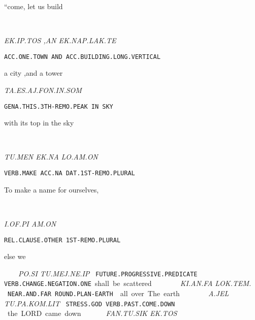 {“come, let us build                                                                          
\drie
 

\ek\ip\tos\comma~\an~\ek\nap\lak\te

{\it EK.IP.TOS		,AN	EK.NAP.LAK.TE	 }

{\tt ACC.ONE.TOWN		AND	ACC.BUILDING.LONG.VERTICAL }

a city			,and 	a tower	 
\drie

\ta\es\aj\fon\Atlanin\som

{\it TA.ES.AJ.FON.IN.SOM }

{\tt GENA.THIS.3TH-REMO.PEAK	IN	SKY }

with its top 				in           the sky 
\drie

  

\tu\men~	\ek\na~		\lo\am\on\comma

{\it TU.MEN	EK.NA		LO.AM.ON }

{\tt VERB.MAKE	ACC.NA		DAT.1ST-REMO.PLURAL	 }

To make 	a name 		for ourselves,

\drie

 

\Atlani\of\Atlanpi ~ \am\on

{\it I.OF.PI			AM.ON }

{\tt REL.CLAUSE.OTHER	1ST-REMO.PLURAL }

else 			we 

\drie
 

\po\si~\tu\mej\Atlanne\ip

{\it PO.SI			  TU.MEJ.NE.IP		 }

{\tt FUTURE.PROGRESSIVE.PREDICATE    VERB.CHANGE.NEGATION.ONE}

shall be			    scattered			
\drie 


\ki\an\fa ~ \lok\tem\period

{\it KI.AN.FA		LOK.TEM. }

{\tt NEAR.AND.FAR		ROUND.PLAN-EARTH }

all over			The earth.
\drie 
 
\Atlana\jel ~ \tu\pa\kom\lit 

{\it A.JEL			TU.PA.KOM.LIT			 }

{\tt STRESS.GOD         VERB.PAST.COME.DOWN		}

the LORD 		came down 			

\drie 

\fan\tu\sik ~ \ek\tos

{\it FAN.TU.SIK		EK.TOS }

}
